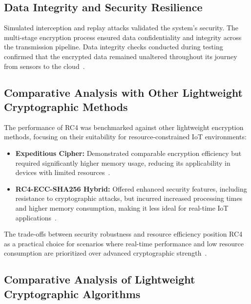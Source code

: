 \documentclass[journal]{Definitions/mdpi}
\begin{document}
\subsection{Data Integrity and Security Resilience}

Simulated interception and replay attacks validated the system's security. The multi-stage encryption process ensured data confidentiality and integrity across the transmission pipeline. Data integrity checks conducted during testing confirmed that the encrypted data remained unaltered throughout its journey from sensors to the cloud~\cite{ref-mdpi1}.

\subsection{Comparative Analysis with Other Lightweight Cryptographic Methods}

The performance of RC4 was benchmarked against other lightweight encryption methods, focusing on their suitability for resource-constrained IoT environments:
\begin{itemize}
    \item \textbf{Expeditious Cipher:} Demonstrated comparable encryption efficiency but required significantly higher memory usage, reducing its applicability in devices with limited resources~\cite{ref-mdpi3, ref-journal8, ref-mdpi8}.
    \item \textbf{RC4-ECC-SHA256 Hybrid:} Offered enhanced security features, including resistance to cryptographic attacks, but incurred increased processing times and higher memory consumption, making it less ideal for real-time IoT applications~\cite{ref-mdpi5, ref-journal8, ref-mdpi8}.
\end{itemize}
The trade-offs between security robustness and resource efficiency position RC4 as a practical choice for scenarios where real-time performance and low resource consumption are prioritized over advanced cryptographic strength~\cite{ref-mdpi4, ref-journal8, ref-mdpi8}.

\subsection{Comparative Analysis of Lightweight Cryptographic Algorithms}
\end{document}
